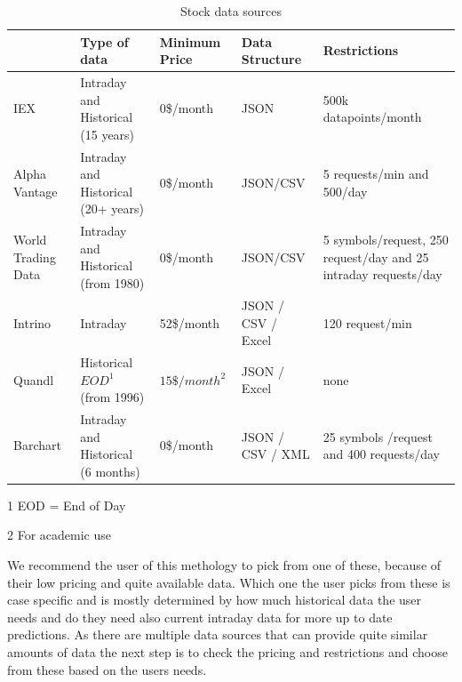 \begin{table}[! htbp]\centering 
    \caption{Stock data sources}
    \begin{threeparttable}
        \begin{tabular}{|p{2cm}|p{2.5cm}|l|p{2cm}|p{3cm}|} 
        \hline
        & Type of data & Minimum Price & Data Structure & Restrictions \\ \hline
        IEX \cite{iex}& Intraday and Historical (15 years) & 0\$/month & JSON & 500k datapoints/month \\ \hline
        Alpha Vantage \cite{alphavantage}  & Intraday and Historical (20+ years)& 0\$/month & JSON/CSV & 5 requests/min and 500/day\\ \hline
        World Trading Data \cite{worldtradingdata} & Intraday and Historical (from 1980) & 0\$/month & JSON/CSV & 5 symbols/request, 250 request/day and 25 intraday requests/day\\ \hline
        Intrino \cite{intrino} & Intraday & 52\$/month & JSON / CSV / Excel & 120 request/min\\ \hline
        Quandl \cite{quandl} & Historical $EOD^1$ (from 1996) & $15\$/month^2$ & JSON / Excel & none\\ \hline
        Barchart \cite{barchart} & Intraday and Historical (6 months) & 0\$/month & JSON / CSV / XML & 25 symbols /request and 400 requests/day\\
        \hline
        \end{tabular}
        \begin{tablenotes}\footnotesize
            \item[1] EOD = End of Day
            \item[2] For academic use 
        \end{tablenotes}
    \end{threeparttable}        
\end{table}

We recommend the user of this methology to pick from one of these, because of their low pricing and quite available data.
Which one the user picks from these is case specific and is mostly determined by how much historical data the user needs and do they need also current intraday data for more up to date predictions.
As there are multiple data sources that can provide quite similar amounts of data the next step is to check the pricing and restrictions and choose from these based on the users needs.

